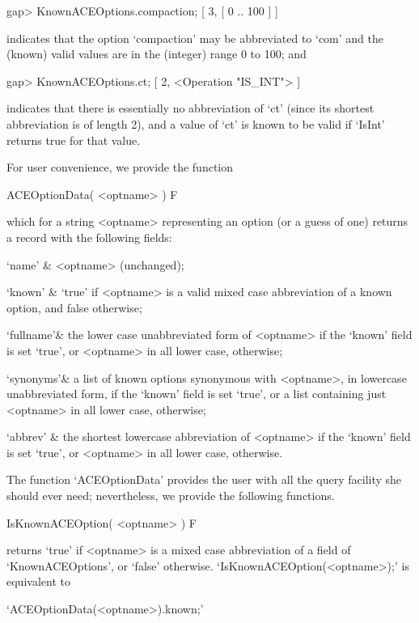 \beginexample
gap> KnownACEOptions.compaction;
[ 3, [ 0 .. 100 ] ]
\endexample

indicates that the option `compaction' may be  abbreviated  to  `com'
and the (known) valid values are in the (integer) range 0 to 100; and

\beginexample
gap> KnownACEOptions.ct;
[ 2, <Operation "IS_INT"> ]
\endexample

indicates that there is essentially no abbreviation of `ct' (since its
shortest abbreviation is of length 2),  and a value of  `ct' is  known
to be valid if `IsInt' returns true for that value.

\beginitems

For user convenience, we provide the function

\>ACEOptionData( <optname> ) F

which for a string <optname> representing an {\ACE} option (or a guess
of one) returns a record with the following fields:

\beginitems

\quad`name'   & <optname> (unchanged);

\quad`known'  & `true' if <optname> is a valid mixed case abbreviation
of a known {\ACE} option, and false otherwise;

\quad`fullname'& the lower case unabbreviated form of <optname> if the
`known'  field  is  set  `true',  or  <optname>  in  all  lower  case,
otherwise;

\quad`synonyms'& a  list  of  known  {\ACE}  options  synonymous  with
<optname>, in lowercase unabbreviated form, if the  `known'  field  is
set `true', or a list containing just <optname>  in  all  lower  case,
otherwise;

\quad`abbrev' & the shortest lowercase abbreviation  of  <optname>  if
the `known' field is set `true',  or  <optname>  in  all  lower  case,
otherwise.

\enditems

The function `ACEOptionData' provides the  user  with  all  the  query
facility she should ever need; nevertheless, we provide the  following
functions.

\>IsKnownACEOption( <optname> ) F

returns `true' if <optname> is a mixed case abbreviation of a field of
`KnownACEOptions',           or           `false'           otherwise.
`IsKnownACEOption(<optname>);'        is         equivalent         to

\beginitems
\qquad`ACEOptionData(<optname>).known;'
\enditems

